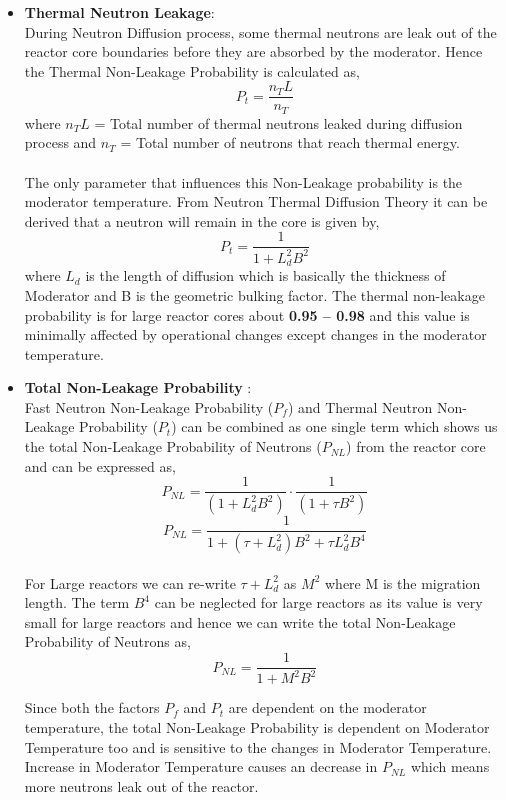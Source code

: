 \documentclass{article}
\begin{document}
\begin{itemize}
\begin{itemize}
        \item \textbf{Thermal Neutron Leakage}:\\
            During Neutron Diffusion process, some thermal neutrons are leak out of the reactor core boundaries before they are absorbed by the moderator. Hence the Thermal Non-Leakage Probability is calculated as,
            $$P_t = \frac{n_TL}{n_T}$$
            where $n_TL$ = Total number of thermal neutrons leaked during diffusion process and $n_T$ = Total number of neutrons that reach thermal energy.\\
            \\
            The only parameter that influences this Non-Leakage probability is the moderator temperature. From Neutron Thermal Diffusion Theory it can be derived that a neutron will remain in the core is given by,
            $$P_t = \frac{1}{1 + L_d^2B^2}$$
            where $L_d$ is the length of diffusion which is basically the thickness of Moderator and B is the geometric bulking factor. 
            The thermal non-leakage probability is for large reactor cores about \textbf{0.95 – 0.98} and this value is minimally affected by operational changes except changes in the moderator temperature.\cite{cite11}\\
            
        \item\textbf{ Total Non-Leakage Probability} :\\
            Fast Neutron Non-Leakage Probability ($P_f$) and Thermal Neutron Non-Leakage Probability ($P_t$) can be combined as one single term which shows us the total Non-Leakage Probability of Neutrons ($P_{NL}$) from the reactor core and can be expressed as,
            $$P_{NL} = \frac{1}{(1 + L_d^2B^2)}\cdot \frac{1}{(1 + \tau B^2)} $$
            $$P_{NL} = \frac{1}{1 + (\tau + L_d^2)B^2 + \tau L_d^2B^4}$$\\
            
            For Large reactors we can re-write $\tau + L_d^2$ as $M^2$ where M is the migration length. The term $B^4$ can be neglected for large reactors as its value is very small for large reactors and hence we can write the total Non-Leakage Probability of Neutrons as,
            $$P_{NL} = \frac{1}{1 + M^2B^2}$$
            
            Since both the factors $P_f$ and $P_t$ are dependent on the moderator temperature, the total Non-Leakage Probability is dependent on Moderator Temperature too and is sensitive to the changes in Moderator Temperature. Increase in Moderator Temperature causes an decrease in $P_{NL}$ which means more neutrons leak out of the reactor.\cite{cite13}\\
            \\
            

\end{itemize}
\end{itemize}
\end{document}
